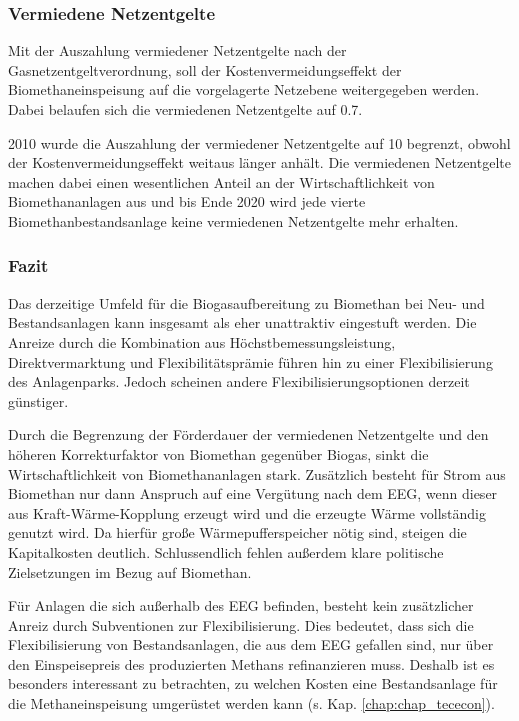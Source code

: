 \subsubsection{Vermiedene Netzentgelte}\label{chap:law_vN}

Mit der Auszahlung vermiedener Netzentgelte nach der Gasnetzentgeltverordnung, soll der Kostenvermeidungseffekt der Biomethaneinspeisung auf die vorgelagerte Netzebene weitergegeben werden. Dabei belaufen sich die vermiedenen Netzentgelte auf \SI{0.7}{\ctkwh}.\smallskip

\SI{2010}{\relax} wurde die Auszahlung der vermiedener Netzentgelte auf \SI{10}{\Jahre} begrenzt, obwohl der Kostenvermeidungseffekt weitaus länger anhält. Die vermiedenen Netzentgelte machen dabei einen wesentlichen Anteil an der Wirtschaftlichkeit von Biomethananlagen aus und bis Ende \SI{2020}{\relax} wird jede vierte Biomethanbestandsanlage keine vermiedenen Netzentgelte mehr erhalten. \parencite{dena2018}


\subsubsection{Fazit}

Das derzeitige Umfeld für die Biogasaufbereitung zu Biomethan bei Neu- und Bestandsanlagen kann insgesamt als eher unattraktiv eingestuft werden. Die Anreize durch die Kombination aus Höchstbemessungsleistung, Direktvermarktung und Flexibilitätsprämie führen hin zu einer Flexibilisierung des Anlagenparks. Jedoch scheinen andere Flexibilisierungsoptionen derzeit günstiger.\smallskip

Durch die Begrenzung der Förderdauer der vermiedenen Netzentgelte und den höheren Korrekturfaktor von Biomethan gegenüber Biogas, sinkt die Wirtschaftlichkeit von Biomethananlagen stark. Zusätzlich besteht für Strom aus Biomethan nur dann Anspruch auf eine Vergütung nach dem \gls{EEG}, wenn dieser aus Kraft-Wärme-Kopplung erzeugt wird und die erzeugte Wärme vollständig genutzt wird. Da hierfür große Wärmepufferspeicher nötig sind, steigen die Kapitalkosten deutlich. Schlussendlich fehlen außerdem klare politische Zielsetzungen im Bezug auf Biomethan. \parencite{BDEW2019a}\smallskip

Für Anlagen die sich außerhalb des \gls{EEG} befinden, besteht kein zusätzlicher Anreiz durch Subventionen zur Flexibilisierung. Dies bedeutet, dass sich die Flexibilisierung von Bestandsanlagen, die aus dem \gls{EEG} gefallen sind, nur über den Einspeisepreis des produzierten Methans refinanzieren muss. Deshalb ist es besonders interessant zu betrachten, zu welchen Kosten eine Bestandsanlage für die Methaneinspeisung umgerüstet werden kann (s. Kap. \ref{chap:chap_tececon}).

